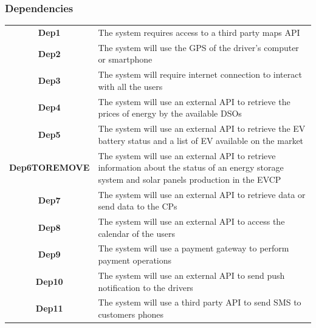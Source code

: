 \subsubsection{Dependencies}
\begin{table}[H]
      \begin{tabularx}{\textwidth}{cX}
            \toprule
            \textbf{Dep1}         & The system requires access to a third party maps API                                                                                             \\
            \textbf{Dep2}         & The system will use the GPS of the driver's computer or smartphone                                                                               \\
            \textbf{Dep3}         & The system will require internet connection to interact with all the users                                                                       \\
            \textbf{Dep4}         & The system will use an external API to retrieve the prices of energy by the available DSOs                                                       \\
            \textbf{Dep5}         & The system will use an external API to retrieve the EV battery status and a list of EV available on the market                                   \\
            \textbf{Dep6TOREMOVE} & The system will use an external API to retrieve information about the status of an energy storage system and solar panels production in the EVCP \\
            \textbf{Dep7}         & The system will use an external API to retrieve data or send data to the CPs                                                                     \\
            \textbf{Dep8}         & The system will use an external API to access the calendar of the users                                                                          \\
            \textbf{Dep9}         & The system will use a payment gateway to perform payment operations                                                                              \\
            \textbf{Dep10}        & The system will use an external API to send push notification to the drivers                                                                     \\
            \textbf{Dep11}        & The system will use a third party API to send SMS to customers phones                                                                            \\
            \bottomrule
      \end{tabularx}
\end{table}
